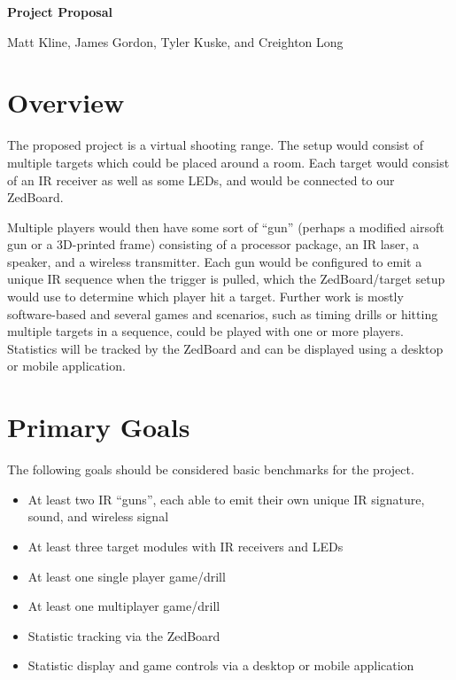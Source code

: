 \documentclass{report}
\begin{document}
\begin{center}
\begin{Huge}
\textbf{Project Proposal}
\end{Huge}

Matt Kline, James Gordon, Tyler Kuske, and Creighton Long
\end{center}

\section*{Overview}
The proposed project is a virtual shooting range.
The setup would consist of multiple targets which could be placed around a room.
Each target would consist of an IR receiver as well as some LEDs, and would be connected to our ZedBoard.

Multiple players would then have some sort of ``gun'' (perhaps a modified airsoft gun or a 3D-printed frame)
consisting of a processor package, an IR laser, a speaker, and a wireless transmitter.
Each gun would be configured to emit a unique IR sequence when the trigger is pulled,
which the ZedBoard/target setup would use to determine which player hit a target.
Further work is mostly software-based and several games and scenarios,
such as timing drills or hitting multiple targets in a sequence, could be played with one or more players.
Statistics will be tracked by the ZedBoard and can be displayed using a desktop or mobile application.

\section*{Primary Goals}

The following goals should be considered basic benchmarks for the project.

\begin{itemize}
\item At least two IR ``guns'', each able to emit their own unique IR signature, sound, and wireless signal
\item At least three target modules with IR receivers and LEDs
\item At least one single player game/drill
\item At least one multiplayer game/drill
\item Statistic tracking via the ZedBoard
\item Statistic display and game controls via a desktop or mobile application
\end{itemize}
\end{document}
